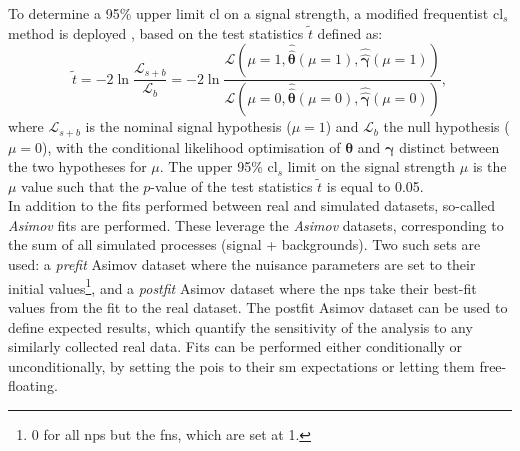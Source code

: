 To determine a 95\% upper limit \gls{cl} on a signal strength, a modified frequentist \gls{cl}$_s$ method is deployed \cite{asympForm, ALRead_2002}, based on the test statistics $\tilde{t}$ defined as:
\begin{equation}
    \tilde{t} = -2 \ln \frac{\mathcal{L}_{s+b}}{\mathcal{L}_{b}} = -2 \ln \frac{\mathcal{L}\left(\mu = 1, \hat{\hat{\boldsymbol{\theta}}}(\mu = 1), \hat{\hat{\boldsymbol{\gamma}}}(\mu = 1) \right)}{\mathcal{L}\left(\mu = 0, \hat{\hat{\boldsymbol{\theta}}}(\mu = 0), \hat{\hat{\boldsymbol{\gamma}}}(\mu = 0) \right)},
\end{equation}
where $\mathcal{L}_{s+b}$ is the nominal signal hypothesis ($\mu = 1$) and $\mathcal{L}_{b}$ the null hypothesis ($\mu = 0$), with the conditional likelihood optimisation of $\boldsymbol{\theta}$ and $\boldsymbol{\gamma}$ distinct between the two hypotheses for $\mu$. The upper 95\% \gls{cl}$_s$ limit on the signal strength $\mu$ is the $\mu$ value such that the $p$-value of the test statistics $\tilde{t}$ is equal to 0.05.\\

In addition to the fits performed between real and simulated datasets, so-called \textit{Asimov} fits are performed. These leverage the \textit{Asimov} datasets, corresponding to the sum of all simulated processes (signal + backgrounds). Two such sets are used: a \textit{prefit} Asimov dataset where the nuisance parameters are set to their initial values\footnote{0 for all \glspl{np} but the \glspl{fn}, which are set at 1.}, and a \textit{postfit} Asimov dataset where the \glspl{np} take their best-fit values from the fit to the real dataset. The postfit Asimov dataset can be used to define expected results, which quantify the sensitivity of the analysis to any similarly collected real data. Fits can be performed either conditionally or unconditionally, by setting the \glspl{poi} to their \gls{sm} expectations or letting them free-floating. 

